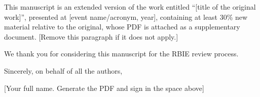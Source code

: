 \documentclass[11pt,a4paper,english]{article}
\begin{document}
This manuscript is an extended version of the work entitled ``[title of the original work]'', presented at [event name/acronym, year], containing at least 30\% new material relative to the original, whose PDF is attached as a supplementary document. [Remove this paragraph if it does not apply.]

\bigskip

We thank you for considering this manuscript for the RBIE review process.

Sincerely, on behalf of all the authors,

\vspace{2.5cm}

[Your full name. Generate the PDF and sign in the space above]
\end{document}
